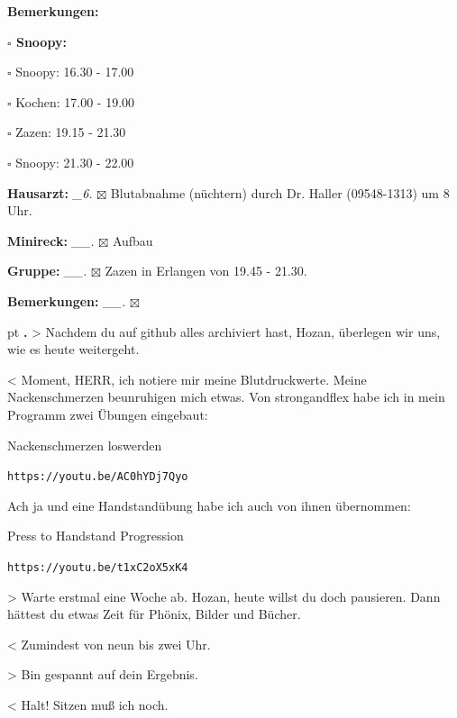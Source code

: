 \documentclass[10pt,a4paper]{article}
\newcounter{notec}
\newcommand\notep[1]{%
  \stepcounter{notec}
  \vskip #1pt
  {\bf\arabic{notec}.}
}
\newcommand\prop[1] {{\color {alizarin} {\bf #1}}}             %
\newcommand\opti[1] {{\color {amethyst} {\bf #1}}}             %
\newcommand\mand[1] {{\color {burntorange} {\bf #1}}}          %
\newcommand\bottomspace{\vskip 4pt}
\newcommand\n[1] { {\sl #1.} \hskip 5pt }
\begin{document}
\begin{mdframed}[style=daystyle]
\begin{labeling}{{\mand {Bemerkungen:}}}
\begin{minipage}{0.75\textwidth}
\begin{labeling}{\prop {$\square$ {Snoopy:}}}
      \item[$\square$ Snoopy:] 16.30 - 17.00
      \item[$\square$ Kochen:] 17.00 - 19.00
        
      \item[$\square$ Zazen:]  19.15 - 21.30
      \item[$\square$ Snoopy:] 21.30 - 22.00
      \end{labeling}
    \end{minipage}
    \bottomspace
  \item[{\opti {Hausarzt:}}]      \n{\_6} $\boxtimes$ Blutabnahme (nüchtern) durch Dr. Haller (09548-1313) um 8 Uhr.
  \item[{\opti {Minireck:}}]     \n{\_\_} $\boxtimes$ Aufbau
  \item[{\opti {Gruppe:}}]       \n{\_\_} $\boxtimes$ Zazen in Erlangen von 19.45 - 21.30.
  \item[{\mand {Bemerkungen:}}]  \n{\_\_} $\boxtimes$
  \end{labeling}
    
  \setcounter{notec}{0}
  
  \notep 0 > Nachdem du auf github alles archiviert hast, Hozan, überlegen wir
  uns, wie es heute weitergeht.

  \vskip 2pt
  < Moment, HERR, ich notiere mir meine Blutdruckwerte. Meine Nackenschmerzen
  beunruhigen mich etwas. Von strongandflex habe ich in mein Programm zwei
  Übungen eingebaut:

  \vskip 2pt
  Nackenschmerzen loswerden


  \vskip 2pt
  \verb+https://youtu.be/AC0hYDj7Qyo+

  \vskip 2pt
  Ach ja und eine Handstandübung habe ich auch von ihnen übernommen:

  \vskip 2pt
  Press to Handstand Progression

  \vskip 2pt
  \verb+https://youtu.be/t1xC2oX5xK4+

  \vskip 2pt
  > Warte erstmal eine Woche ab. Hozan, heute willst du doch pausieren. Dann
  hättest du etwas Zeit für Phönix, Bilder und Bücher.

  \vskip 2pt
  < Zumindest von neun bis zwei Uhr.

  \vskip 2pt
  > Bin gespannt auf dein Ergebnis.

  \vskip 2pt
  < Halt! Sitzen muß ich noch.

\end{mdframed}
\end{document}
